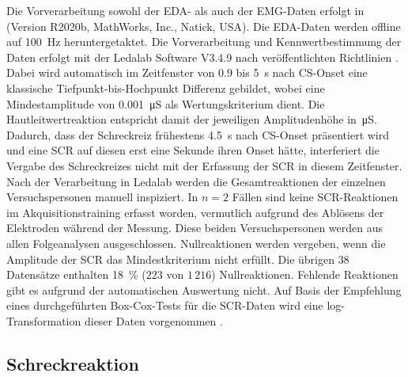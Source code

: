 			Die Vorverarbeitung sowohl der EDA- als auch der EMG-Daten erfolgt in \citeauthor{MATLAB} (Version R2020b, MathWorks, Inc., Natick, USA).	
			Die EDA-Daten werden offline auf \SI{100}{\hertz} heruntergetaktet. Die Vorverarbeitung und Kennwertbestimmung der Daten erfolgt mit der Ledalab Software V3.4.9 \parencite{BENEDEK2010} nach veröffentlichten Richtlinien \parencite{BOUCSEIN2012}. Dabei wird automatisch im Zeitfenster von $0.9$ bis \SI{5}{\second} nach CS-Onset eine klassische Tiefpunkt-bis-Hochpunkt Differenz gebildet, wobei eine Mindestamplitude von \SI{0.001}{\micro\siemens} als Wertungskriterium dient. Die Hautleitwertreaktion entspricht damit der jeweiligen Amplitudenhöhe in~\si{\micro\siemens}. Dadurch, dass der Schreckreiz frühestens \SI{4.5}{\second} nach CS-Onset präsentiert wird und eine SCR auf diesen erst eine Sekunde ihren  Onset hätte, interferiert die Vergabe des Schreckreizes nicht mit der Erfassung der SCR in diesem Zeitfenster.
			Nach der Verarbeitung in Ledalab werden die Gesamtreaktionen der einzelnen Versuchspersonen manuell inspiziert. In $n=2$ Fällen sind keine SCR-Reaktionen im Akquisitionstraining erfasst worden, vermutlich aufgrund des Ablösens der Elektroden während der Messung. Diese beiden Versuchspersonen werden aus allen Folgeanalysen ausgeschlossen.
			Nullreaktionen werden vergeben, wenn die Amplitude der SCR das Mindestkriterium nicht erfüllt. Die übrigen $38$ Datensätze enthalten \SI{18}{\percent} ($223$ von $1\,216$) Nullreaktionen. Fehlende Reaktionen gibt es aufgrund der automatischen Auswertung nicht.
			Auf Basis der Empfehlung eines durchgeführten Box-Cox-Tests für die SCR-Daten wird eine log-Transformation dieser Daten vorgenommen \parencite{BOX1964}.
		
		\subsection{Schreckreaktion}\label{emgscore}
				
